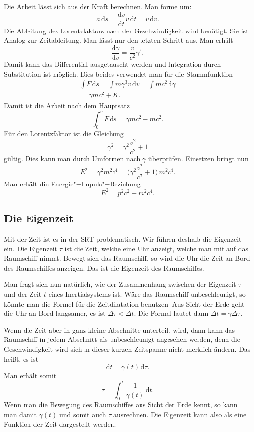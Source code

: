 \documentclass[a4paper,11pt,fleqn,twocolumn,twoside,dvipdfmx]{scrartcl}
\begin{document}
Die Arbeit lässt sich aus der Kraft berechnen. Man forme um:%
\[a\,\mathrm ds = \frac{\mathrm dv}{\mathrm dt} v\,\mathrm dt
= v\,\mathrm dv.\]
Die Ableitung des Lorentzfaktors nach der Geschwindigkeit wird
benötigt. Sie ist Analog zur Zeitableitung. Man lässt nur den letzten
Schritt aus. Man erhält%
\[\frac{\mathrm d\gamma}{\mathrm dv} = \frac{v}{c^2} \gamma^3.\]
Damit kann das Differential ausgetauscht werden und Integration durch
Substitution ist möglich. Dies beides verwendet man für die
Stammfunktion%
\begin{gather*}
\int F\,\mathrm ds = \int m\gamma^3 v\,\mathrm dv
= \int mc^2\,\mathrm d\gamma\\
= \gamma mc^2 + K.
\end{gather*}
Damit ist die Arbeit nach dem Hauptsatz%
\[\int_0^v F\,\mathrm ds = \gamma mc^2 - mc^2.\]
Für den Lorentzfaktor ist die Gleichung%
\[\gamma^2=\gamma^2\frac{v^2}{c^2}+1\]
gültig. Dies kann man durch Umformen nach $\gamma$ überprüfen.
Einsetzen bringt nun%
\[E^2 = \gamma^2m^2c^4
= \Big(\gamma^2\frac{v^2}{c^2}+1\Big)\,m^2c^4.\]
Man erhält die Energie"=Impuls"=Beziehung%
\[E^2 = p^2c^2+m^2c^4.\]


\subsection{Die Eigenzeit}

Mit der Zeit ist es in der SRT problematisch. Wir führen deshalb die
Eigenzeit ein. Die Eigenzeit $\tau$ ist die Zeit, welche eine Uhr
anzeigt, welche man mit auf das Raumschiff nimmt. Bewegt sich das
Raumschiff, so wird die Uhr die Zeit an Bord des Raumschiffes
anzeigen. Das ist die Eigenzeit des Raumschiffes.

Man fragt sich nun natürlich, wie der Zusammenhang zwischen der
Eigenzeit $\tau$ und der Zeit $t$ eines Inertialsystems ist.
Wäre das Raumschiff unbeschleunigt, so könnte man die Formel für die
Zeitdilatation benutzen. Aus Sicht der Erde geht die Uhr an Bord
langsamer, es ist
$\Delta\tau<\Delta t$.
Die Formel lautet dann $\Delta t = \gamma\Delta\tau.$

Wenn die Zeit aber in ganz kleine Abschnitte unterteilt wird,
dann kann das Raumschiff in jedem Abschnitt als unbeschleunigt
angesehen werden, denn die Geschwindigkeit wird sich in dieser
kurzen Zeitspanne nicht merklich ändern. Das heißt, es ist%
\[\mathrm dt = \gamma(t)\,\mathrm d\tau.\]
Man erhält somit
\[\tau = \int_0^t \frac{1}{\gamma(t)}\,\mathrm dt.\]
Wenn man die Bewegung des Raumschiffes aus Sicht der Erde kennt,
so kann man damit $\gamma(t)$ und somit auch $\tau$ ausrechnen.
Die Eigenzeit kann also als eine Funktion der Zeit dargestellt werden.
\end{document}
